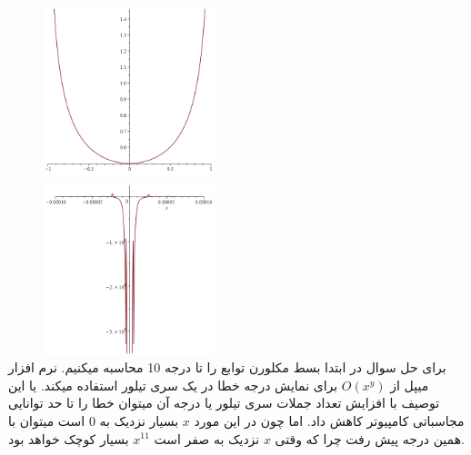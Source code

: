 \documentclass[12pt, letterpaper]{article}
\begin{document}
\includegraphics[height=5cm, width=7cm]{figure1.png}
\includegraphics[height=5cm, width=7cm]{figure2.png}
\\


برای حل سوال در ابتدا بسط مکلورن توابع را تا درجه 10 محاسبه میکنیم. نرم افزار میپل از
\(O(x^y)\)
 برای نمایش درجه خطا در یک سری تیلور استفاده میکند. یا این توصیف با افزایش تعداد جملات سری تیلور یا درجه آن میتوان خطا را تا حد توانایی مجاسباتی کامپیوتر کاهش داد. اما چون در این مورد 
\(x\)
 بسیار نزدیک به 0 است میتوان با همین درجه پیش رفت چرا که وقتی 
\(x\) 
 نزدیک به صفر است 
\(x^{11}\)
 بسیار کوچک خواهد بود.
\\
\end{document}
